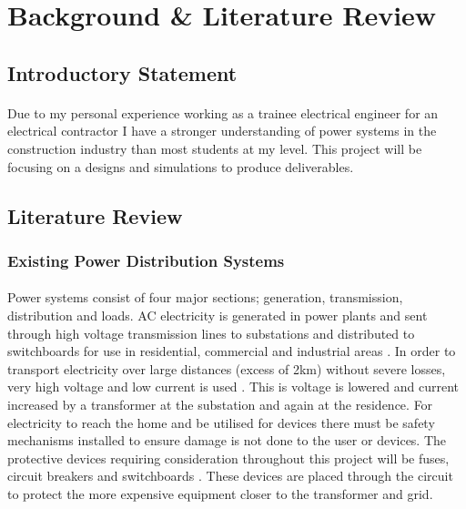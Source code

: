 
\section{Background \& Literature Review}

\subsection{Introductory Statement}

\paragraph{} 
Due to my personal experience working as a trainee electrical engineer for an electrical contractor I have a stronger understanding of power systems in the construction industry than most students at my level. This project will be focusing on a designs and simulations to produce deliverables.  


\subsection{Literature Review}

\subsubsection{Existing Power Distribution Systems}

\paragraph{}
Power systems consist of four major sections; generation, transmission, distribution and loads. AC electricity is generated in power plants and sent through high voltage transmission lines to substations and distributed to switchboards for use in residential, commercial and industrial areas \cite{Amin2011}. In order to transport electricity over large distances (excess of 2km) without severe losses, very high voltage and low current is used \cite{Amin2011}. This is voltage is lowered and current increased by a transformer at the substation and again at the residence. For electricity to reach the home and be utilised for devices there must be safety mechanisms installed to ensure damage is not done to the user or devices. The protective devices requiring consideration throughout this project will be fuses, circuit breakers and switchboards \cite{UnitedStatesDepartmentoftheInterior2000}. These devices are placed through the circuit to protect the more expensive equipment closer to the transformer and grid.  

